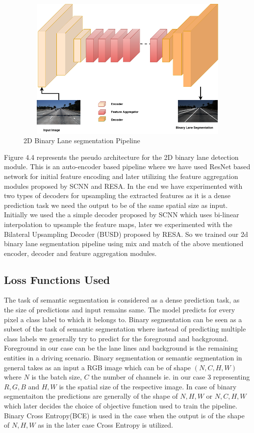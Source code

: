            \begin{figure}[h]
    \centering
    \includegraphics[width=12cm, height=7cm]{images/2dlane_pipleline.png}
    \caption{2D Binary Lane segmentation Pipeline}
    \end{figure}
        
        Figure 4.4 represents the pseudo architecture for the 2D binary lane detection module. This is an auto-encoder based pipeline where we have used ResNet \cite{DBLP:journals/corr/HeZRS15} based network for initial feature encoding and later utilizing the feature aggregation modules proposed by SCNN\cite{pan2018SCNN} and RESA\cite{DBLP:journals/corr/abs-2008-13719}. In the end we have experimented with two types of decoders for upsampling the extracted features as it is a dense prediction task we need the output to be of the same spatial size as input. Initially we used the a simple decoder proposed by SCNN\cite{pan2018SCNN} which uses bi-linear interpolation to upsample the feature maps, later we experimented with the Bilateral Upsampling Decoder (BUSD) proposed by RESA\cite{DBLP:journals/corr/abs-2008-13719}. So we trained our 2d binary lane segmentation pipeline using mix and match of the above mentioned encoder, decoder and feature aggregation modules.
        
        \subsection{Loss Functions Used}
        The task of semantic segmentation is considered as a dense prediction task, as the size of predictions and input remains same. The model predicts for every pixel a class label to which it belongs to. Binary segmentation can be seen as a subset of the task of semantic segmentation where instead of predicting multiple class labels we generally try to predict for the foreground and background. Foreground in our case can be the lane lines and background is the remaining entities in a driving scenario.
        Binary segmentation or semantic segmentation in general takes as an input a RGB image which can be of shape $(N,C,H,W)$ where $N$ is the batch size, $C$ the number of channels ie. in our case 3 representing $R, G, B$ and $H,W$ is the spatial size of the respective image. In case of binary segmentaiton the predictions are generally of the shape of $N,H,W$ or $N,C,H,W$ which later decides the choice of objective function used to train the pipeline. Binary Cross Entropy(BCE) is used in the case when the output is of the shape of $N,H,W$ as in the later case Cross Entropy is utilized.
        

